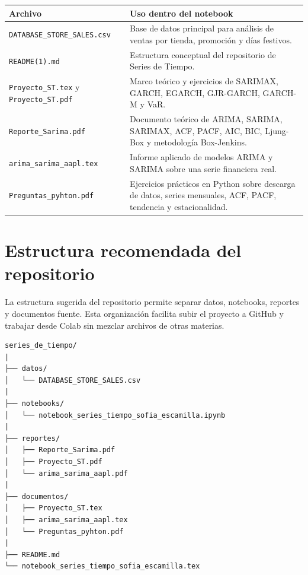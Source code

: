 \documentclass[12pt,a4paper]{article}
\begin{document}
\begin{longtable}{p{5cm}p{9cm}}
\toprule
\textbf{Archivo} & \textbf{Uso dentro del notebook} \\
\midrule
\endhead
\texttt{DATABASE\_STORE\_SALES.csv} & Base de datos principal para análisis de ventas por tienda, promoción y días festivos. \\
\texttt{README(1).md} & Estructura conceptual del repositorio de Series de Tiempo. \\
\texttt{Proyecto\_ST.tex} y \texttt{Proyecto\_ST.pdf} & Marco teórico y ejercicios de SARIMAX, GARCH, EGARCH, GJR-GARCH, GARCH-M y VaR. \\
\texttt{Reporte\_Sarima.pdf} & Documento teórico de ARIMA, SARIMA, SARIMAX, ACF, PACF, AIC, BIC, Ljung-Box y metodología Box-Jenkins. \\
\texttt{arima\_sarima\_aapl.tex} & Informe aplicado de modelos ARIMA y SARIMA sobre una serie financiera real. \\
\texttt{Preguntas\_pyhton.pdf} & Ejercicios prácticos en Python sobre descarga de datos, series mensuales, ACF, PACF, tendencia y estacionalidad. \\
\bottomrule
\end{longtable}

\section{Estructura recomendada del repositorio}

\begin{markdowncell}
La estructura sugerida del repositorio permite separar datos, notebooks, reportes y documentos fuente. Esta organización facilita subir el proyecto a GitHub y trabajar desde Colab sin mezclar archivos de otras materias.
\end{markdowncell}

\begin{lstlisting}[style=textstyle]
series_de_tiempo/
|
├── datos/
│   └── DATABASE_STORE_SALES.csv
|
├── notebooks/
│   └── notebook_series_tiempo_sofia_escamilla.ipynb
|
├── reportes/
│   ├── Reporte_Sarima.pdf
│   ├── Proyecto_ST.pdf
│   └── arima_sarima_aapl.pdf
|
├── documentos/
│   ├── Proyecto_ST.tex
│   ├── arima_sarima_aapl.tex
│   └── Preguntas_pyhton.pdf
|
├── README.md
└── notebook_series_tiempo_sofia_escamilla.tex
\end{lstlisting}

\end{document}
